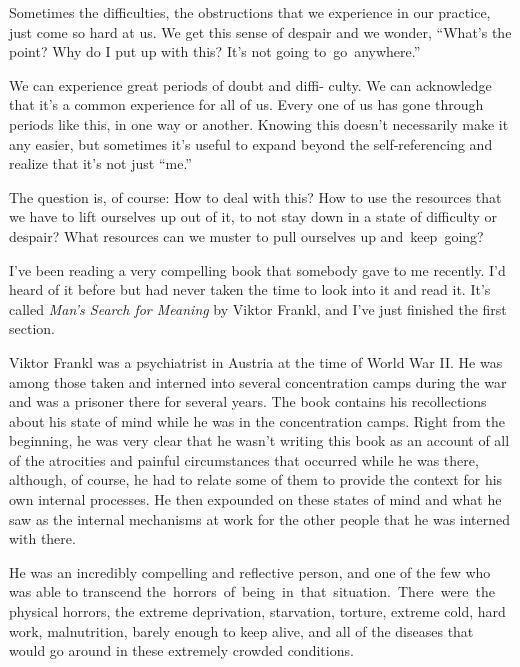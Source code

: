 Sometimes the difficulties, the obstructions that we experience in our practice, just come so hard at us. We get this sense of despair and we wonder, ``What's the point? Why do I put up with this? It's not going \mbox{to go anywhere.''}

We can experience great periods of doubt and diffi- \linebreak culty. We can acknowledge that it's a common experience for all of us. Every one of us has gone through periods like this, in one way or another. Knowing this doesn't necessarily make it any easier, but sometimes it's useful to expand beyond the self-referencing and realize that it's not just ``me.''

The question is, of course: How to deal with this? How to use the resources that we have to lift ourselves up out of it, to not stay down in a state of difficulty or despair? What resources can we muster to pull ourselves up \mbox{and keep going?}

I've been reading a very compelling book that somebody gave to me recently. I'd heard of it before but had never taken the time to look into it and read it. It's called \emph{Man's Search for Meaning} by Viktor Frankl, and I've just finished the first section.

Viktor Frankl was a psychiatrist in Austria at the time of World War II. He was among those taken and interned into several concentration camps during the war and was a prisoner there for several years. The book contains his recollections about his state of mind while he was in the concentration camps. Right from the beginning, he was very clear that he wasn't writing this book as an account of all of the atrocities and painful circumstances that occurred while he was there, although, of course, he had to relate some of them to provide the context for his own internal processes. He then expounded on these states of mind and what he saw as the internal mechanisms at work for the other people that he was interned with there.

He was an incredibly compelling and reflective person, and one of the few who was able to transcend \mbox{the horrors of being in that situation. There were the} physical horrors, the extreme deprivation, starvation, torture, extreme cold, hard work, malnutrition, barely enough to keep alive, and all of the diseases that would go around in these extremely crowded conditions.

